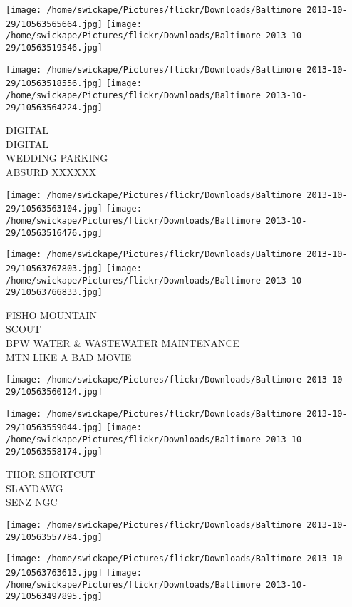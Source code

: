 \documentclass[10pt,letterpaper]{article}
\begin{document}
\texttt{[image: /home/swickape/Pictures/flickr/Downloads/Baltimore 2013-10-29/10563565664.jpg]}
\texttt{[image: /home/swickape/Pictures/flickr/Downloads/Baltimore 2013-10-29/10563519546.jpg]}

\texttt{[image: /home/swickape/Pictures/flickr/Downloads/Baltimore 2013-10-29/10563518556.jpg]}
\texttt{[image: /home/swickape/Pictures/flickr/Downloads/Baltimore 2013-10-29/10563564224.jpg]}

DIGITAL\\
DIGITAL\\
WEDDING PARKING\\
ABSURD XXXXXX
\pagebreak

\texttt{[image: /home/swickape/Pictures/flickr/Downloads/Baltimore 2013-10-29/10563563104.jpg]}
\texttt{[image: /home/swickape/Pictures/flickr/Downloads/Baltimore 2013-10-29/10563516476.jpg]}

\texttt{[image: /home/swickape/Pictures/flickr/Downloads/Baltimore 2013-10-29/10563767803.jpg]}
\texttt{[image: /home/swickape/Pictures/flickr/Downloads/Baltimore 2013-10-29/10563766833.jpg]}

FISHO MOUNTAIN\\
SCOUT\\
BPW WATER \& WASTEWATER MAINTENANCE\\
MTN LIKE A BAD MOVIE
\pagebreak

\texttt{[image: /home/swickape/Pictures/flickr/Downloads/Baltimore 2013-10-29/10563560124.jpg]}

\vspace{0.25in}
\texttt{[image: /home/swickape/Pictures/flickr/Downloads/Baltimore 2013-10-29/10563559044.jpg]}
\texttt{[image: /home/swickape/Pictures/flickr/Downloads/Baltimore 2013-10-29/10563558174.jpg]}

THOR SHORTCUT\\
SLAYDAWG\\
SENZ NGC
\pagebreak

\texttt{[image: /home/swickape/Pictures/flickr/Downloads/Baltimore 2013-10-29/10563557784.jpg]}

\vspace{0.25in}
\texttt{[image: /home/swickape/Pictures/flickr/Downloads/Baltimore 2013-10-29/10563763613.jpg]}
\texttt{[image: /home/swickape/Pictures/flickr/Downloads/Baltimore 2013-10-29/10563497895.jpg]}
\end{document}
